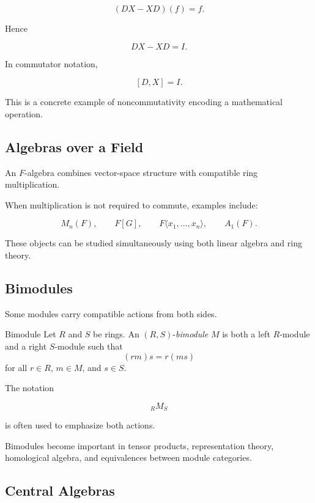 \[ (DX-XD)(f)=f. \]

Hence

\[ DX-XD=I. \]

In commutator notation,

\[ [D,X]=I. \]

This is a concrete example of noncommutativity encoding a mathematical
operation.

\subsection{Algebras over a Field}
\label{subsec:noncommutative-algebras-over-field}

An \(F\)-algebra combines vector-space structure with compatible ring
multiplication.

When multiplication is not required to commute, examples include:

\[ M_n(F),\qquad F[G],\qquad F\langle x_1,\ldots,x_n\rangle,\qquad A_1(F). \]

These objects can be studied simultaneously using both linear algebra and
ring theory.

\subsection{Bimodules}
\label{subsec:bimodules}

Some modules carry compatible actions from both sides.

\begin{definitionbox}{Bimodule}
Let \(R\) and \(S\) be rings. An \((R,S)\)-\emph{bimodule} \(M\) is both a
left \(R\)-module and a right \(S\)-module such that
\[ (rm)s=r(ms) \]
for all \(r\in R\), \(m\in M\), and \(s\in S\).
\end{definitionbox}

The notation

\[ {}_RM_S \]

is often used to emphasize both actions.

Bimodules become important in tensor products, representation theory,
homological algebra, and equivalences between module categories.

\subsection{Central Algebras}
\label{subsec:central-algebras}

